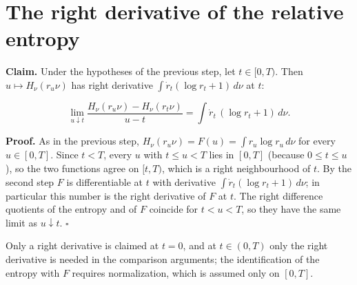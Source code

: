 \documentclass[11pt,a4paper]{article}
\begin{document}
\section{\texorpdfstring{The right derivative of the relative entropy}{The right derivative of the relative entropy}}


\textbf{Claim.} Under the hypotheses of the previous step, let \(t\in[0,T)\). Then \(u\mapsto H_\nu(r_u\nu)\) has right derivative \(\int\dot r_t(\log r_t+1)\,d\nu\) at \(t\):


\[\lim_{u\downarrow t}\frac{H_\nu(r_u\nu)-H_\nu(r_t\nu)}{u-t}=\int\dot r_t\,(\log r_t+1)\,d\nu.\]


\textbf{Proof.} As in the previous step, \(H_\nu(r_u\nu)=F(u)=\int r_u\log r_u\,d\nu\) for every \(u\in[0,T]\). Since \(t<T\), every \(u\) with \(t\le u<T\) lies in \([0,T]\) (because \(0\le t\le u\)), so the two functions agree on \([t,T)\), which is a right neighbourhood of \(t\). By the second step \(F\) is differentiable at \(t\) with derivative \(\int\dot r_t(\log r_t+1)\,d\nu\); in particular this number is the right derivative of \(F\) at \(t\). The right difference quotients of the entropy and of \(F\) coincide for \(t<u<T\), so they have the same limit as \(u\downarrow t\). \(\square\)




Only a right derivative is claimed at \(t=0\), and at \(t\in(0,T)\) only the right derivative is needed in the comparison arguments; the identification of the entropy with \(F\) requires normalization, which is assumed only on \([0,T]\).
\end{document}
